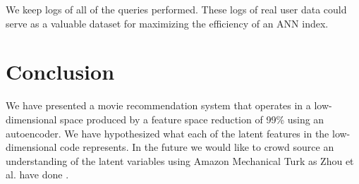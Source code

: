 \documentclass[conference]{IEEEtran}
\begin{document}
We keep logs of all of the queries performed.  These logs of real user data could serve as a valuable dataset for maximizing the efficiency of an ANN index.

\section{Conclusion} We have presented a movie recommendation system that
operates in a low-dimensional space produced by a feature space reduction of
99\% using an autoencoder. We have hypothesized what each of the latent
features in the low-dimensional code represents. In the future we would like
to crowd source an understanding of the latent variables using Amazon
Mechanical Turk as Zhou et al. have done \cite{zhou2014object}.


\raggedright


\end{document}
